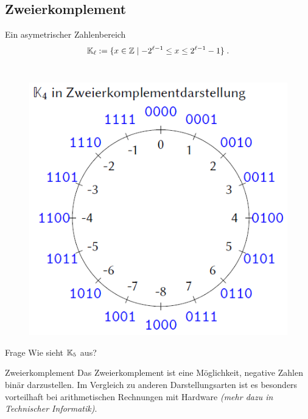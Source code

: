 \subsection{Zweierkomplement}
\begin{frame}{Ein asymetrischer Zahlenbereich}
	\[
	\mathbb{K}_{\ell} := \{ x\in \mathbb{Z}\mid -2^{\ell-1} \leq x \leq 2^{\ell-1} -1 \} \;.
	\]
	\\[0.2cm]
	
	\begin{figure}
		\centering
		\includegraphics[scale=0.35]{ZK_K4}
	\end{figure}

	\begin{exampleblock}{Frage}
		Wie sieht $\mathbb{K}_5$ aus?
	\end{exampleblock}
\end{frame}

\begin{frame}{Zweierkomplement} %
    Das Zweierkomplement ist eine Möglichkeit, negative Zahlen binär darzustellen. Im Vergleich zu anderen Darstellungsarten ist es besonders vorteilhaft bei arithmetischen Rechnungen mit Hardware \textit{(mehr dazu in Technischer Informatik)}.
\end{frame}

